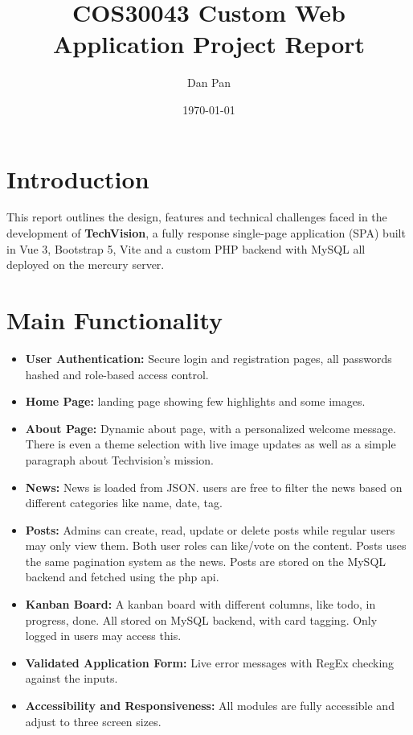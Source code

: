 \documentclass[11pt,a4paper]{article}
\title{COS30043 Custom Web Application Project Report}
\author{Dan Pan}
\date{\today}
\begin{document}
\maketitle

\section*{Introduction}

This report outlines the design, features and technical challenges faced in the development of \textbf{TechVision}, a fully response single-page application (SPA) built in Vue 3, Bootstrap 5, Vite and a custom PHP backend with MySQL all deployed on the mercury server.

\section*{Main Functionality}

\begin{itemize}
    \item \textbf{User Authentication:} Secure login and registration pages, all passwords hashed and role-based access control.
    \item \textbf{Home Page:} landing page showing few highlights and some images.
    \item \textbf{About Page:} Dynamic about page, with a personalized welcome message. There is even a theme selection with live image updates as well as a simple paragraph about Techvision's mission.
    \item \textbf{News:} News is loaded from JSON. users are free to filter the news based on different categories like name, date, tag.
    \item \textbf{Posts:} Admins can create, read, update or delete posts while regular users may only view them. Both user roles can like/vote on the content. Posts uses the same pagination system as the news. Posts are stored on the MySQL backend and fetched using the php api.
    \item \textbf{Kanban Board:} A kanban board with different columns, like todo, in progress, done. All stored on MySQL backend, with card tagging. Only logged in users may access this.
    \item \textbf{Validated Application Form:} Live error messages with RegEx checking against the inputs.
    \item \textbf{Accessibility and Responsiveness:} All modules are fully accessible and adjust to three screen sizes.
\end{itemize}
\end{document}

